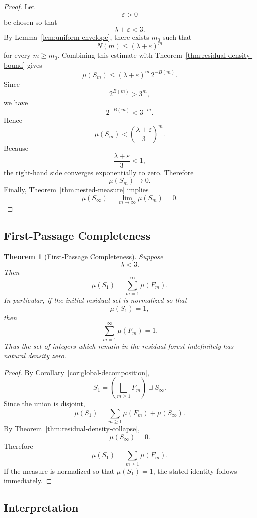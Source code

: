 \documentclass[12pt, oneside]{article}
\numberwithin{equation}{section}
\theoremstyle{definition}
\theoremstyle{plain}
\newtheorem{theorem}{Theorem}[section]
\theoremstyle{remark}
\begin{document}
\begin{proof}
Let
\[
\varepsilon > 0
\]
be chosen so that
\[
\lambda + \varepsilon < 3.
\]
By Lemma~\ref{lem:uniform-envelope}, there exists
\(m_0\) such that
\[
N(m) \le (\lambda+\varepsilon)^m
\] 
for every \(m\ge m_0\).  Combining this estimate with
Theorem~\ref{thm:residual-density-bound} gives
\[
\mu(S_m) \le (\lambda+\varepsilon)^m \,2^{-B(m)}.
\]
Since
\[
2^{B(m)} > 3^m,
\]
we have
\[
2^{-B(m)} < 3^{-m}.
\]
Hence
\[ \mu(S_m) < \left( \frac{\lambda+\varepsilon}{3} \right)^m.
\]
Because
\[
\frac{\lambda+\varepsilon} {3} < 1,
\]
the right-hand side converges exponentially to zero. Therefore
\[
\mu(S_m) \to 0.
\]
Finally, Theorem~\ref{thm:nested-measure} implies
\[
\mu(S_\infty) = \lim_{m\to\infty}\mu(S_m) = 0.
\]
\end{proof}

\subsection{First-Passage Completeness}

\begin{theorem}[First-Passage Completeness]
\label{thm:first-passage-completeness}
Suppose
\[
\lambda < 3.
\]
Then
\[
\mu(S_1) = \sum_{m=1}^{\infty} \mu(F_m).
\]
In particular, if the initial residual set is normalized so that
\[
\mu(S_1) = 1,
\]
then
\[
\sum_{m=1}^{\infty} \mu(F_m) = 1.
\]
Thus the set of integers which remain in the residual forest
indefinitely has natural density zero.
\end{theorem}

\begin{proof}
By Corollary~\ref{cor:global-decomposition},
\[
S_1 = \left( \bigsqcup_{m\ge1}F_m \right) \sqcup S_\infty.
\]
Since the union is disjoint,
\[
\mu(S_1) = \sum_{m\ge1}\mu(F_m) + \mu(S_\infty).
\]
By Theorem~\ref{thm:residual-density-collapse},
\[
\mu(S_\infty) = 0.
\]
Therefore
\[
\mu(S_1) = \sum_{m\ge1} \mu(F_m).
\]
If the measure is normalized so that \(\mu(S_1)=1\),
the stated identity follows immediately.
\end{proof}

\subsection{Interpretation}
\end{document}
